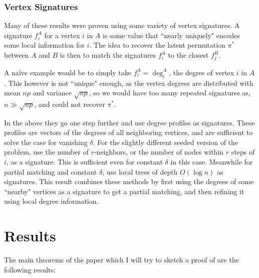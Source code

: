 \documentclass[11pt]{article}
\begin{document}
	\subsubsection{Vertex Signatures}
	
	Many of these results were proven using some variety of vertex signatures. A signature $ f_i^A $ for a vertex $ i $ in $ A $ is some value that ``nearly uniquely" encodes some local information for $ i $. The idea to recover the latent permutation $ \pi^* $ between $ A $ and $ B $ is then to match the signatures $ f_i^A $ to the closest $ f_j^B $.
	
	A na\" ive example would be to simply take $ f_i^A=\deg_i^A $, the degree of vertex $ i $ in $ A $. This however is not ``unique" enough, as the vertex degrees are distributed with mean $ np $ and variance $ \sqrt{np} $, so we would have too many repeated signatures as, $ n \gg \sqrt{np} $, and could not recover $ \pi^* $.
	
	In the above \cite{DMWX18} they go one step further and use degree profiles as signatures. These profiles are vectors of the degrees of all neighboring vertices, and are sufficient to solve the case for vanishing $ \delta $. For the slightly different seeded version of the problem, \cite{mossel2020seeded} use the number of $ r $-neighbors, or the number of nodes within $ r $ steps of $ i $, as a signature. This is sufficient even for constant $ \delta $ in this case. Meanwhile for partial matching and constant $ \delta $,  \cite{ganassali2021correlation} use local trees of depth $ O(\log n) $ as signatures. This result combines these methods by first using the degrees of some ``nearby" vertices as a signature to get a partial matching, and then refining it using local degree information.
	
	\section{Results}
	
	The main theorems of the paper which I will try to sketch a proof of are the following results:
	
\end{document}
